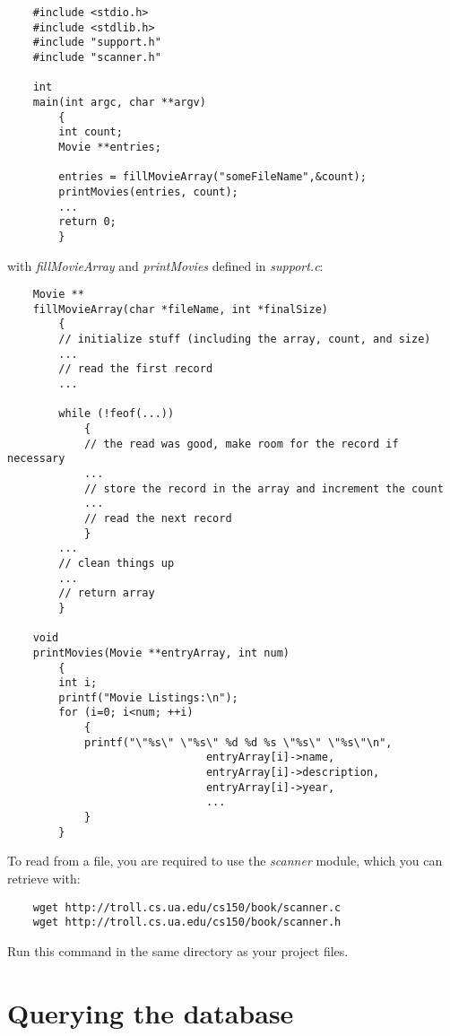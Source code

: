 \documentclass{article}
\begin{document}
\begin{verbatim}
    #include <stdio.h>
    #include <stdlib.h>
    #include "support.h"
    #include "scanner.h"
    
    int
    main(int argc, char **argv)
        {
        int count;
        Movie **entries;
        
        entries = fillMovieArray("someFileName",&count);
        printMovies(entries, count);
        ...
        return 0;
        }
\end{verbatim}

with {\it fillMovieArray} and {\it printMovies} defined in {\it support.c}:

\begin{verbatim}
    Movie **
    fillMovieArray(char *fileName, int *finalSize)
        {
        // initialize stuff (including the array, count, and size)
        ...
        // read the first record
        ...

        while (!feof(...))
            {
            // the read was good, make room for the record if necessary
            ...
            // store the record in the array and increment the count
            ...
            // read the next record
            }
        ...
        // clean things up
        ...
        // return array
        }

    void
    printMovies(Movie **entryArray, int num)
        {
        int i;
        printf("Movie Listings:\n");
        for (i=0; i<num; ++i)
            {
            printf("\"%s\" \"%s\" %d %d %s \"%s\" \"%s\"\n",
                               entryArray[i]->name,
                               entryArray[i]->description,
                               entryArray[i]->year,
                               ...
            }
        }
\end{verbatim}

To read from a file, you are required to use the {\it scanner} module, which
you can retrieve with:

\begin{verbatim}
    wget http://troll.cs.ua.edu/cs150/book/scanner.c
    wget http://troll.cs.ua.edu/cs150/book/scanner.h
\end{verbatim}

Run this command in the same directory as your project files.

\section*{Querying the database}
\end{document}
